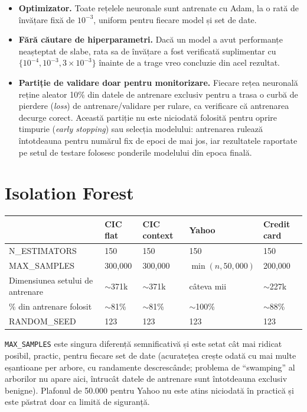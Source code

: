 \begin{itemize}
  \item \textbf{Optimizator.} Toate rețelele neuronale sunt antrenate cu Adam, la o rată de învățare fixă de $10^{-3}$, uniform pentru fiecare model și set de date.
  \item \textbf{Fără căutare de hiperparametri.} Dacă un model a avut performanțe neașteptat de slabe, rata sa de învățare a fost verificată suplimentar cu $\{10^{-4}, 10^{-3}, 3\times10^{-3}\}$ înainte de a trage vreo concluzie din acel rezultat.
  \item \textbf{Partiție de validare doar pentru monitorizare.} Fiecare rețea neuronală reține aleator 10\% din datele de antrenare exclusiv pentru a trasa o curbă de pierdere (\emph{loss}) de antrenare/validare per rulare, ca verificare că antrenarea decurge corect. Această partiție nu este niciodată folosită pentru oprire timpurie (\emph{early stopping}) sau selecția modelului: antrenarea rulează întotdeauna pentru numărul fix de epoci de mai jos, iar rezultatele raportate pe setul de testare folosesc ponderile modelului din epoca finală.
\end{itemize}

\section{Isolation Forest}

\begin{center}
\begin{tabular}{@{}lllll@{}}
\toprule
 & CIC flat & CIC context & Yahoo & Credit card \\
\midrule
N\_ESTIMATORS & 150 & 150 & 150 & 150 \\
MAX\_SAMPLES & 300{,}000 & 300{,}000 & $\min(n, 50{,}000)$ & 200{,}000 \\
Dimensiunea setului de antrenare & $\sim$371k & $\sim$371k & câteva mii & $\sim$227k \\
\% din antrenare folosit & $\sim$81\% & $\sim$81\% & $\sim$100\% & $\sim$88\% \\
RANDOM\_SEED & 123 & 123 & 123 & 123 \\
\bottomrule
\end{tabular}
\end{center}

\texttt{MAX\_SAMPLES} este singura diferență semnificativă și este setat cât mai ridicat posibil, practic, pentru fiecare set de date (acuratețea crește odată cu mai multe eșantioane per arbore, cu randamente descrescânde;
problema de \enquote{swamping} al arborilor nu apare aici, întrucât datele de antrenare sunt întotdeauna exclusiv benigne). Plafonul de 50.000 pentru Yahoo nu este atins niciodată în practică și este păstrat doar ca limită de siguranță.

